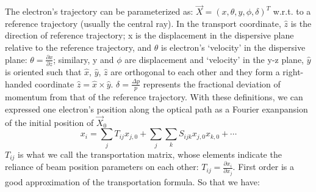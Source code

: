 The electron's trajectory can be parameterized as: $\vec{X} = (x, \theta, y, \phi, \delta)^T$ 
w.r.t. to a reference trajectory (usually the central ray). In the transport coordinate, 
$\hat{z}$ is the direction of reference trajectory;
x is the displacement in the dispersive plane relative to the reference 
trajectory, and $\theta$ is electron's `velocity' in the dispersive plane:
$\theta = \frac{\partial x}{\partial z}$; similary, y and $\phi$ are displacement
and `velocity' in the y-z plane, $\hat{y}$ is oriented such that $\hat{x}$, 
$\hat{y}$, $\hat{z}$ are orthogonal to each other and they form a 
right-handed coordinate $\hat{z} = \hat{x} \times \hat{y}$.
$\delta = \frac{\Delta p}{p}$ represents the fractional deviation of momentum
from that of the reference trajectory. With these definitions, we can expressed
one electron's position along the optical path as a Fourier exanpansion of the
initial position of $\vec{X}_0$
\begin{equation}
    x_i = \sum_j T_{ij} x_{j,0} + \sum_j \sum_k S_{ijk} x_{j,0}x_{k, 0} + \cdots
\end{equation}
$T_{ij}$ is what we call the transportation matrix, whose elements indicate
the reliance of beam position parameters on each other: $T_{ij} = \frac{\partial x_i}{\partial x_j}$.
First order is a good approximation of the transportation formula. So that we
have:
